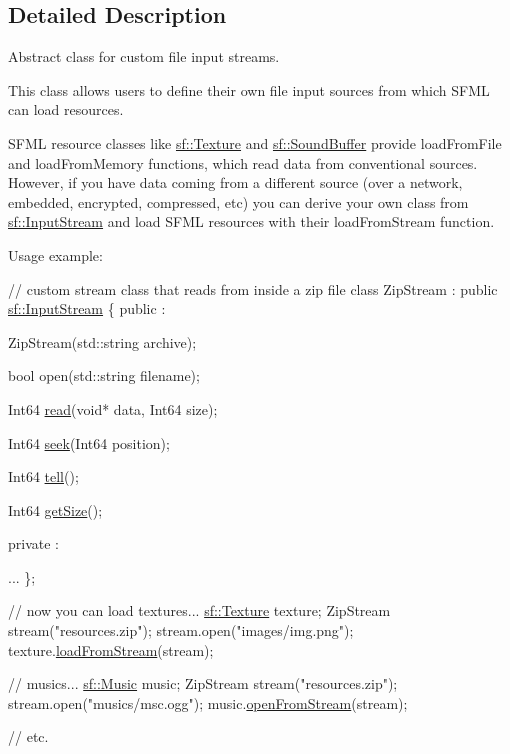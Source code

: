 \subsection{Detailed Description}
Abstract class for custom file input streams. 

This class allows users to define their own file input sources from which S\+F\+M\+L can load resources.

S\+F\+M\+L resource classes like \hyperlink{classsf_1_1_texture}{sf\+::\+Texture} and \hyperlink{classsf_1_1_sound_buffer}{sf\+::\+Sound\+Buffer} provide load\+From\+File and load\+From\+Memory functions, which read data from conventional sources. However, if you have data coming from a different source (over a network, embedded, encrypted, compressed, etc) you can derive your own class from \hyperlink{classsf_1_1_input_stream}{sf\+::\+Input\+Stream} and load S\+F\+M\+L resources with their load\+From\+Stream function.

Usage example\+: 
\begin{DoxyCode}
\textcolor{comment}{// custom stream class that reads from inside a zip file}
\textcolor{keyword}{class }ZipStream : \textcolor{keyword}{public} \hyperlink{classsf_1_1_input_stream}{sf::InputStream}
\{
\textcolor{keyword}{public} :

    ZipStream(std::string archive);

    \textcolor{keywordtype}{bool} open(std::string filename);

    Int64 \hyperlink{classsf_1_1_input_stream_a8dd89c74c1acb693203f50e750c6ae53}{read}(\textcolor{keywordtype}{void}* data, Int64 size);

    Int64 \hyperlink{classsf_1_1_input_stream_a76aba8e5d5cf9b1c5902d5e04f7864fc}{seek}(Int64 position);
    
    Int64 \hyperlink{classsf_1_1_input_stream_a599515b9ccdbddb6fef5a98424fd559c}{tell}();

    Int64 \hyperlink{classsf_1_1_input_stream_a311eaaaa65d636728e5153b574b72d5d}{getSize}();

\textcolor{keyword}{private} :

    ...
\};

\textcolor{comment}{// now you can load textures...}
\hyperlink{classsf_1_1_texture}{sf::Texture} texture;
ZipStream stream(\textcolor{stringliteral}{"resources.zip"});
stream.open(\textcolor{stringliteral}{"images/img.png"});
texture.\hyperlink{classsf_1_1_texture_a6803a13465a7113a8964d1081841886d}{loadFromStream}(stream);

\textcolor{comment}{// musics...}
\hyperlink{classsf_1_1_music}{sf::Music} music;
ZipStream stream(\textcolor{stringliteral}{"resources.zip"});
stream.open(\textcolor{stringliteral}{"musics/msc.ogg"});
music.\hyperlink{classsf_1_1_music_a4e55d1910a26858b44778c26b237d673}{openFromStream}(stream);

\textcolor{comment}{// etc.}
\end{DoxyCode}
 

